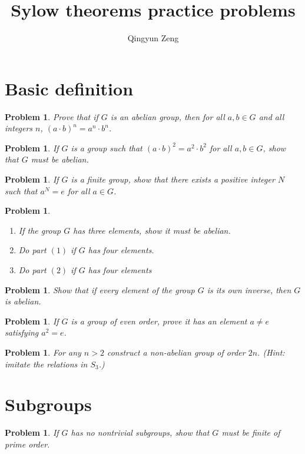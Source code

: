 \documentclass[12pt]{amsart}
\newtheorem{prob}[thm]{Problem}
\theoremstyle{definition}
\theoremstyle{remark}
\numberwithin{equation}{section}
\begin{document}
	\author{Qingyun Zeng}
\title{Sylow theorems practice problems}


\maketitle
\tableofcontents	
\section{Basic definition}
\begin{prob}
Prove that if $G$ is an abelian group, then for all $a,b \in G$ and all integers
$n$, $(a\cdot b)^n = a^n\cdot b^n$.
\end{prob}
\begin{prob}
	If $G$ is a group such that $(a\cdot b)^2 = a^2\cdot b^2$ for all $a, b \in G$, show that
	$G$ must be abelian. 
\end{prob}
\begin{prob}
	If $G$ is a finite group, show that there exists a positive integer $N$ such
	that $a^N = e$ for all $a \in G$.
\end{prob}

\begin{prob}
	\begin{enumerate}
		\item If the group $G$ has three elements, show it must be abelian.
		\item Do part $(1)$ if $G$ has four elements.
		\item Do part $(2)$ if $G$ has four elements
	\end{enumerate}
\end{prob}

\begin{prob}
	 Show that if every element of the group $G$ is its own inverse, then $G$ is abelian.
\end{prob}

\begin{prob}
	If $G$ is a group of even order, prove it has an element $a \not= e$ satisfying
	$a^2 =e$. 
\end{prob}

\begin{prob}
	For any $n > 2$ construct a non-abelian group of order $2n$. (Hint:
	imitate the relations in $S_3$.)
\end{prob}

\section{Subgroups}
\begin{prob}
	If $G$ has no nontrivial subgroups, show that $G$ must be finite of
	prime order. 
\end{prob}
\end{document}
